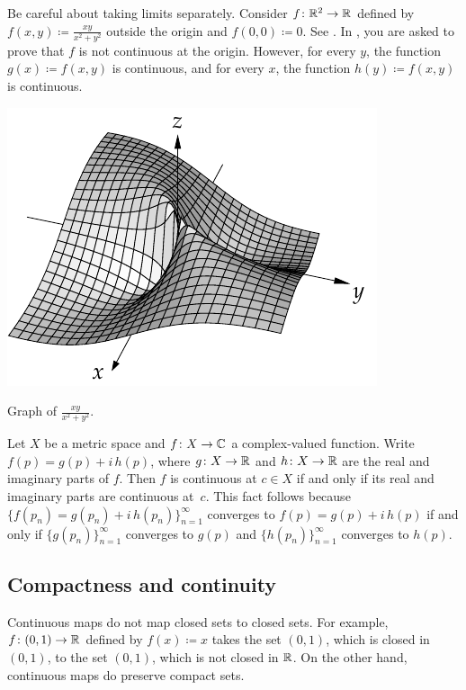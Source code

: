 Be careful about taking limits separately.
Consider $f \colon {\mathbb{R}}^2 \to {\mathbb{R}}$ defined by $f(x,y) \coloneqq \frac{xy}{x^2+y^2}$
outside the origin and $f(0,0) \coloneqq 0$.
See .
In ,
you are asked to prove that $f$ is not continuous at the origin.
However, for every $y$, the function $g(x) \coloneqq f(x,y)$ is
continuous,
and for every $x$, the function $h(y) \coloneqq f(x,y)$ is continuous.
\begin{myfigureht}
\includegraphics{figures/xyxsqysq}
\caption{Graph of $\frac{xy}{x^2+y^2}$.\label{fig:xyxsqysq}}
\end{myfigureht}

\begin{example}
Let $X$ be a metric space and $f \colon X \to {\mathbb{C}}$ a complex-valued
function.  Write $f(p) = g(p) + i \, h(p)$, where $g \colon X \to {\mathbb{R}}$
and $h \colon X \to {\mathbb{R}}$ are the real and imaginary parts of $f$.
Then $f$ is continuous at $c \in X$ if and only if its real
and imaginary parts are continuous at~$c$.  
This fact follows because $\bigl\{ f(p_n) = g(p_n) + i \, h(p_n) \bigr\}_{n=1}^\infty$
converges to $f(p) = g(p) + i \, h(p)$ if and only if
$\bigl\{ g(p_n) \bigr\}_{n=1}^\infty$ converges to $g(p)$ and
$\bigl\{ h(p_n) \bigr\}_{n=1}^\infty$ converges to $h(p)$.
\end{example}

\subsection{Compactness and continuity}

Continuous maps do not map closed sets to closed sets.  For example,
$f \colon (0,1) \to {\mathbb{R}}$ defined by $f(x) \coloneqq x$ takes the set $(0,1)$, which
is closed in $(0,1)$, to the set $(0,1)$, which is not closed in ${\mathbb{R}}$.
On the other hand, continuous maps do preserve compact sets.

